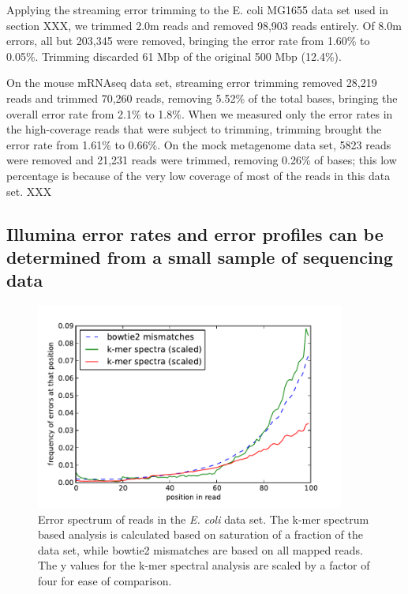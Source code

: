 \documentclass{article}
\begin{document}
Applying the streaming error trimming to the E. coli MG1655 data set
used in section XXX, we trimmed 2.0m reads and removed 98,903
reads entirely.  Of 8.0m errors, all but 203,345 were removed,
bringing the error rate from 1.60\% to 0.05\%.  Trimming discarded 61
Mbp of the original 500 Mbp (12.4\%).

%


% 


On the mouse mRNAseq data set, streaming error trimming removed 28,219
reads and trimmed 70,260 reads, removing 5.52\% of the total bases,
bringing the overall error rate from 2.1\% to 1.8\%.  When we measured
only the error rates in the high-coverage reads that were subject to
trimming, trimming brought the error rate from 1.61\% to 0.66\%.
On the mock metagenome data set, 5823 reads were removed and 21,231
reads were trimmed, removing 0.26\% of bases; this low percentage is
because of the very low coverage of most of the reads in this data set.
XXX

\subsection{Illumina error rates and error profiles can be determined from a
small sample of sequencing data}

\begin{figure}[!ht]
 \centerline{\includegraphics[width=4in]{./figures/ecoli-errhist}}
\caption{Error spectrum of reads in the {\em E. coli} data set. The
  k-mer spectrum based analysis is calculated based on saturation of a
  fraction of the data set, while bowtie2 mismatches are based on all
  mapped reads.  The y values for the k-mer spectral analysis are
  scaled by a factor of four for ease of comparison.}
\label{fig:ecoli_err}
\end{figure}
\end{document}
